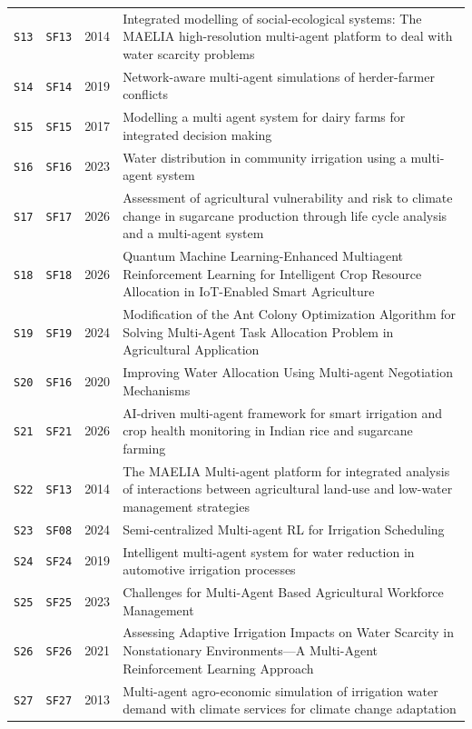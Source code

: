 \begin{longtable}{@{}p{}p{}p{}p{}@{}}
\texttt{S13} & \texttt{SF13} & 2014 & Integrated modelling of social-ecological systems: The MAELIA high-resolution multi-agent platform to deal with water scarcity problems\\
\texttt{S14} & \texttt{SF14} & 2019 & Network-aware multi-agent simulations of herder-farmer conflicts\\
\texttt{S15} & \texttt{SF15} & 2017 & Modelling a multi agent system for dairy farms for integrated decision making\\
\texttt{S16} & \texttt{SF16} & 2023 & Water distribution in community irrigation using a multi-agent system\\
\texttt{S17} & \texttt{SF17} & 2026 & Assessment of agricultural vulnerability and risk to climate change in sugarcane production through life cycle analysis and a multi-agent system\\
\texttt{S18} & \texttt{SF18} & 2026 & Quantum Machine Learning-Enhanced Multiagent Reinforcement Learning for Intelligent Crop Resource Allocation in IoT-Enabled Smart Agriculture\\
\texttt{S19} & \texttt{SF19} & 2024 & Modification of the Ant Colony Optimization Algorithm for Solving Multi-Agent Task Allocation Problem in Agricultural Application\\
\texttt{S20} & \texttt{SF16} & 2020 & Improving Water Allocation Using Multi-agent Negotiation Mechanisms\\
\texttt{S21} & \texttt{SF21} & 2026 & AI-driven multi-agent framework for smart irrigation and crop health monitoring in Indian rice and sugarcane farming\\
\texttt{S22} & \texttt{SF13} & 2014 & The MAELIA Multi-agent platform for integrated analysis of interactions between agricultural land-use and low-water management strategies\\
\texttt{S23} & \texttt{SF08} & 2024 & Semi-centralized Multi-agent RL for Irrigation Scheduling\\
\texttt{S24} & \texttt{SF24} & 2019 & Intelligent multi-agent system for water reduction in automotive irrigation processes\\
\texttt{S25} & \texttt{SF25} & 2023 & Challenges for Multi-Agent Based Agricultural Workforce Management\\
\texttt{S26} & \texttt{SF26} & 2021 & Assessing Adaptive Irrigation Impacts on Water Scarcity in Nonstationary Environments---A Multi-Agent Reinforcement Learning Approach\\
\texttt{S27} & \texttt{SF27} & 2013 & Multi-agent agro-economic simulation of irrigation water demand with climate services for climate change adaptation\\

\end{longtable}

